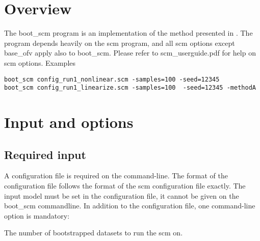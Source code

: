 




\maketitle

\newcommand{\guidetoolname}{boot\_scm}

\section{Overview}

The boot\_scm program is an implementation of the method presented in \cite{Keizer2}.
The program depends heavily on the scm program, and all scm options except base\_ofv
apply also to boot\_scm. Please refer to scm\_userguide.pdf for help on scm options.
Examples
\begin{verbatim}
boot_scm config_run1_nonlinear.scm -samples=100 -seed=12345
boot_scm config_run1_linearize.scm -samples=100  -seed=12345 -methodA
\end{verbatim}

\section{Input and options}
\subsection{Required input}
A configuration file is required on the command-line. The format of the configuration file follows the format of the scm configuration file exactly. 
The input model must be set in the configuration file, it cannot be given on the boot\_scm commandline. 
In addition to the configuration file, one command-line option is mandatory:
\begin{optionlist}
The number of bootstrapped datasets to run the scm on. 
\nextopt
\end{optionlist}

